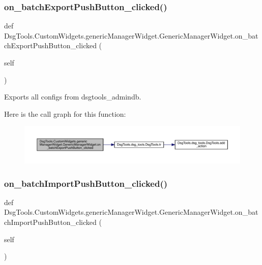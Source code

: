 \subsubsection{\texorpdfstring{on\+\_\+batch\+Export\+Push\+Button\+\_\+clicked()}{on\_batchExportPushButton\_clicked()}}
{\footnotesize\ttfamily def Dsg\+Tools.\+Custom\+Widgets.\+generic\+Manager\+Widget.\+Generic\+Manager\+Widget.\+on\+\_\+batch\+Export\+Push\+Button\+\_\+clicked (\begin{DoxyParamCaption}\item[{}]{self }\end{DoxyParamCaption})}

\begin{DoxyVerb}Exports all configs from dsgtools_admindb.
\end{DoxyVerb}
 Here is the call graph for this function\+:
\nopagebreak
\begin{figure}[H]
\begin{center}
\leavevmode
\includegraphics[width=350pt]{class_dsg_tools_1_1_custom_widgets_1_1generic_manager_widget_1_1_generic_manager_widget_a984787082b2593cfda93ba51b5c9c4f0_cgraph}
\end{center}
\end{figure}
\mbox{\label{class_dsg_tools_1_1_custom_widgets_1_1generic_manager_widget_1_1_generic_manager_widget_a986b7c861f25a0f793bddcc987d0250b}} 
\subsubsection{\texorpdfstring{on\+\_\+batch\+Import\+Push\+Button\+\_\+clicked()}{on\_batchImportPushButton\_clicked()}}
{\footnotesize\ttfamily def Dsg\+Tools.\+Custom\+Widgets.\+generic\+Manager\+Widget.\+Generic\+Manager\+Widget.\+on\+\_\+batch\+Import\+Push\+Button\+\_\+clicked (\begin{DoxyParamCaption}\item[{}]{self }\end{DoxyParamCaption})}

